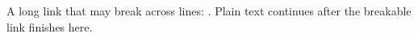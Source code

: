 \documentclass{article}
\begin{document}
A long link that may break across lines:
.
Plain text continues after the breakable link finishes here.
\end{document}
